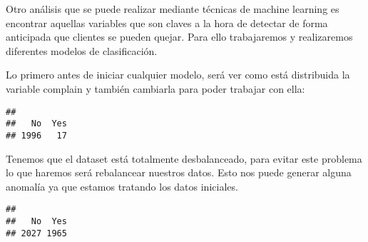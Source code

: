 \documentclass[
]{article}
\newenvironment{Shaded}{\begin{snugshade}}{\end{snugshade}}
\newcommand{\AttributeTok}[1]{\textcolor[rgb]{0.77,0.63,0.00}{#1}}
\newcommand{\DecValTok}[1]{\textcolor[rgb]{0.00,0.00,0.81}{#1}}
\newcommand{\FunctionTok}[1]{\textcolor[rgb]{0.00,0.00,0.00}{#1}}
\newcommand{\NormalTok}[1]{#1}
\newcommand{\OtherTok}[1]{\textcolor[rgb]{0.56,0.35,0.01}{#1}}
\newcommand{\SpecialCharTok}[1]{\textcolor[rgb]{0.00,0.00,0.00}{#1}}
\newcommand{\StringTok}[1]{\textcolor[rgb]{0.31,0.60,0.02}{#1}}
\begin{document}
Otro análisis que se puede realizar mediante técnicas de machine
learning es encontrar aquellas variables que son claves a la hora de
detectar de forma anticipada que clientes se pueden quejar. Para ello
trabajaremos y realizaremos diferentes modelos de clasificación.

Lo primero antes de iniciar cualquier modelo, será ver como está
distribuida la variable complain y también cambiarla para poder trabajar
con ella:

\begin{Shaded}
\end{Shaded}

\begin{verbatim}
## 
##   No  Yes 
## 1996   17
\end{verbatim}

Tenemos que el dataset está totalmente desbalanceado, para evitar este
problema lo que haremos será rebalancear nuestros datos. Esto nos puede
generar alguna anomalía ya que estamos tratando los datos iniciales.

\begin{Shaded}
\end{Shaded}

\begin{verbatim}
## 
##   No  Yes 
## 2027 1965
\end{verbatim}
\end{document}
